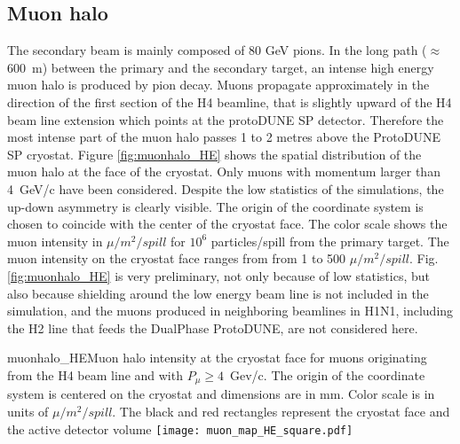 \subsection{Muon halo}
The secondary beam is mainly composed of 80 GeV pions. In the long path ($\approx$ 600~m) between the primary and the secondary target,
 an intense high energy muon halo is produced by pion decay. Muons propagate approximately in the direction of the first section of the H4 beamline, 
 that is slightly upward of the H4 beam line extension which points at the protoDUNE SP detector.  
 Therefore the most intense part of the muon halo passes 1 to 2 metres above the ProtoDUNE SP cryostat. 
Figure \ref{fig:muonhalo_HE} shows the spatial distribution of the muon halo at the face of the cryostat. Only muons with momentum larger than 4~GeV/c have been considered. Despite the low statistics of the simulations, the up-down asymmetry is clearly visible. The origin of the coordinate system is chosen to coincide with the center of the cryostat face. The color scale shows the muon intensity in $\mu /m^2/spill$ for $10^6$ particles/spill from the primary target. The muon intensity on the cryostat face ranges from  from 1 to 500  $\mu /m^2/spill$.
Fig. \ref{fig:muonhalo_HE}  is very preliminary, not only because of low statistics, but also because shielding around the low energy beam line is not included in the simulation, and the muons produced in neighboring beamlines in H1N1, including the H2 line that feeds the DualPhase ProtoDUNE, are not considered here. 
\begin{cdrfigure}{muonhalo_HE}{Muon halo intensity at the cryostat face for muons originating from the H4 beam line and with $P_\mu  \ge 4$~Gev/c. The origin of the coordinate system is centered on the cryostat and dimensions are in mm. Color scale is in units of $\mu /m^2/spill$. The black and red rectangles represent the cryostat face and the active detector volume}
\texttt{[image: muon\_map\_HE\_square.pdf]}
\end{cdrfigure}




